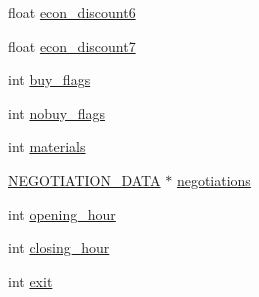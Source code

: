 \begin{DoxyCompactItemize}
float \hyperlink{structshop__data_a0ab5e564dca3a9b1c1d75a07eaf3ecc1}{econ\-\_\-discount6}
\item 
float \hyperlink{structshop__data_aacab1cf09335852d4855fd89c7004382}{econ\-\_\-discount7}
\item 
int \hyperlink{structshop__data_ac26e86529152a6835e4e72ac8715589b}{buy\-\_\-flags}
\item 
int \hyperlink{structshop__data_a22ce6d6e9828d8de7a0015f4486c869e}{nobuy\-\_\-flags}
\item 
int \hyperlink{structshop__data_a57220105ccc23fd54df3fce11f7e0396}{materials}
\item 
\hyperlink{structs_8h_abb8dc637f1e12ff4b7ed2684a11be6d9}{N\-E\-G\-O\-T\-I\-A\-T\-I\-O\-N\-\_\-\-D\-A\-T\-A} $\ast$ \hyperlink{structshop__data_a6533f81eb5c76904b1010f2a1712169d}{negotiations}
\item 
int \hyperlink{structshop__data_ae38c49cdd3f821de967f0a01faf4931b}{opening\-\_\-hour}
\item 
int \hyperlink{structshop__data_a1b3f1f304596c9bfdacc03dfe9d840dd}{closing\-\_\-hour}
\item 
int \hyperlink{structshop__data_a3cbd2e02e5d001542c2bb35db9cbea60}{exit}
\end{DoxyCompactItemize}



